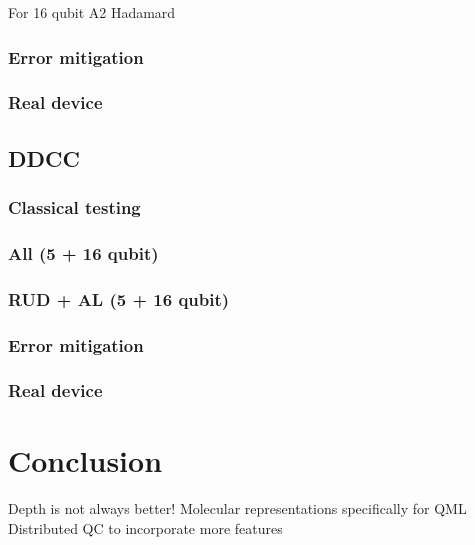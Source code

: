 \documentclass[journal=jacsat,manuscript=article]{achemso}
\begin{document}
For 16 qubit A2 Hadamard


\subsubsection{Error mitigation}
\subsubsection{Real device}

\subsection{DDCC} 

\subsubsection{Classical testing}
\subsubsection{All (5 + 16 qubit)}
\subsubsection{RUD + AL (5 + 16 qubit)}
\subsubsection{Error mitigation}
\subsubsection{Real device}

\section{Conclusion}
Depth is not always better!
Molecular representations specifically for QML
Distributed QC to incorporate more features


\end{document}
